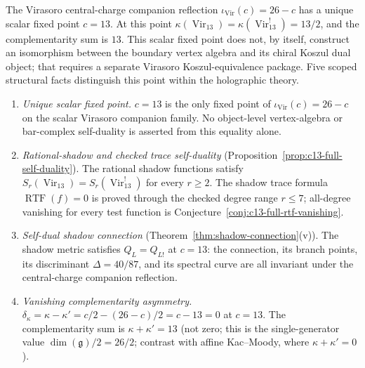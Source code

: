 \begin{remark}[The self-dual central charge $c = 13$]
\label{rem:c13-concordance-holographic}
%
%
\ClaimStatusConditional{}
The Virasoro central-charge companion reflection
\(\iota_{\mathrm{Vir}}(c)=26-c\) has a unique scalar fixed point
\(c=13\).  At this point
\(\kappa(\operatorname{Vir}_{13})
=\kappa(\operatorname{Vir}_{13}^{!})=13/2\), and the
complementarity sum is \(13\).  This scalar fixed point does not, by
itself, construct an isomorphism between the boundary vertex algebra
and its chiral Koszul dual object; that requires a separate Virasoro
Koszul-equivalence package. Five scoped structural facts distinguish
this point within the holographic theory.
\begin{enumerate}[label=\textup{(\roman*)}]
\item \emph{Unique scalar fixed point.}\enspace
 \(c=13\) is the only fixed point of
 \(\iota_{\mathrm{Vir}}(c)=26-c\) on the scalar Virasoro companion
 family.  No object-level vertex-algebra or bar-complex self-duality
 is asserted from this equality alone.

\item \emph{Rational-shadow and checked trace self-duality}
 \textup{(}Proposition~\textup{\ref{prop:c13-full-self-duality}}\textup{)}.
 The rational shadow functions satisfy
 $S_r(\operatorname{Vir}_{13}) = S_r(\operatorname{Vir}_{13}^!)$
 for every $r \geq 2$. The shadow trace formula
 $\operatorname{RTF}(f) = 0$ is proved through the checked degree
 range \(r\leq7\); all-degree vanishing for every test function is
 Conjecture~\ref{conj:c13-full-rtf-vanishing}.

\item \emph{Self-dual shadow connection}
 \textup{(}Theorem~\textup{\ref{thm:shadow-connection}(v)}\textup{)}.
 The shadow metric satisfies $Q_L = Q_{L!}$ at $c = 13$:
 the connection, its branch points, its discriminant
 $\Delta = 40/87$, and its spectral curve are all invariant
 under the central-charge companion reflection.

\item \emph{Vanishing complementarity asymmetry.}\enspace
 $\delta_\kappa = \kappa - \kappa' = c/2 - (26-c)/2 = c - 13 = 0$
 at $c = 13$. The complementarity sum is
 $\kappa + \kappa' = 13$ (not zero; this is the
 single-generator value $\dim(\mathfrak{g})/2 = 26/2$;
 contrast with affine Kac--Moody, where
 $\kappa + \kappa' = 0$).


\end{enumerate}
\end{remark}
